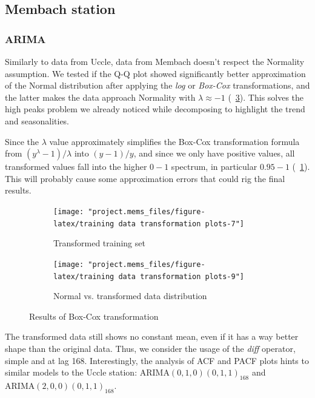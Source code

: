 \documentclass[12pt]{article}
\begin{document}
\subsection{Membach station}
\subsubsection{ARIMA}
Similarly to data from Uccle, data from Membach doesn't respect the Normality assumption. We tested if the Q-Q plot showed significantly better approximation of the Normal distribution after applying the \textit{log} or \textit{Box-Cox} transformations, and the latter makes the data approach Normality with $\lambda\approx-1$ (\figurename~\ref{fig:mems:box-cox}). This solves the high peaks problem we already noticed while decomposing to highlight the trend and seasonalities.

Since the $\lambda$ value approximately simplifies the Box-Cox transformation formula from $(y^\lambda-1)/\lambda$ into $(y-1)/y$, and since we only have positive values, all transformed values fall into the higher $0-1$ spectrum, in particular $0.95-1$ (\figurename~\ref{fig:mems:box-cox:data}). This will probably cause some approximation errors that could rig the final results.

\begin{figure}[h]
	\begin{subfigure}{.5\linewidth}
		\texttt{[image: "project.mems\_files/figure-latex/training data transformation plots-7"]}
		\caption{Transformed training set}
		\label{fig:mems:box-cox:data}
	\end{subfigure}
	\begin{subfigure}{.5\linewidth}
		\texttt{[image: "project.mems\_files/figure-latex/training data transformation plots-9"]}
		\caption{Normal vs. transformed data distribution}
		\label{fig:mems:box-cox:qq}
	\end{subfigure}
	\begin{center}
		\caption{Results of Box-Cox transformation}
		\label{fig:mems:box-cox}
	\end{center}
\end{figure}

The transformed data still shows no constant mean, even if it has a way better shape than the original data. Thus, we consider the usage of the \textit{diff} operator, simple and at lag 168. Interestingly, the analysis of ACF and PACF plots hints to similar models to the Uccle station: 
$\mathrm{ARIMA}(0,1,0)(0,1,1)_{168}$ and $\mathrm{ARIMA}(2,0,0)(0,1,1)_{168}$.
\end{document}
